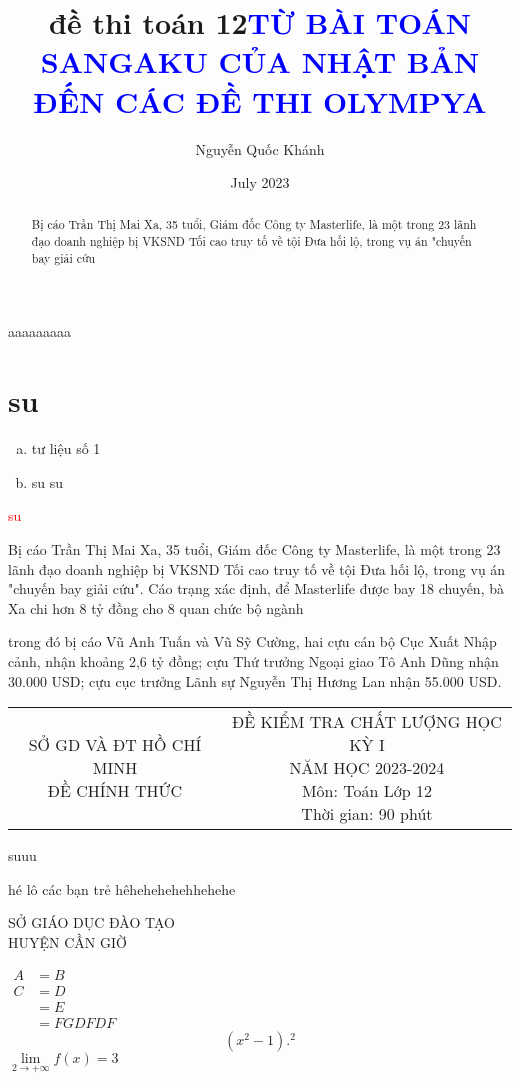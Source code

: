 \documentclass{article}
\title{đề thi toán 12}
\author{Nguyễn Quốc Khánh }
\date{July 2023}
\begin{document}
\fontsize{13pt}{16pt}\selectfont
 \tableofcontents 
\begin{abstract}
    Bị cáo Trần Thị Mai Xa, 35 tuổi, Giám đốc Công ty Masterlife, là một trong 23 lãnh đạo doanh nghiệp bị VKSND Tối cao truy tố về tội Đưa hối lộ, trong vụ án "chuyến bay giải cứu
\end{abstract}
\begin{flushright}
    aaaaaaaaa
\end{flushright}
\section{su}
\begin{enumerate}[a).]
    \item tư liệu số 1
    \item su su
\end{enumerate}
\textcolor{red}{su}
\title{\bfseries \textcolor{blue}{TỪ BÀI TOÁN SANGAKU CỦA NHẬT BẢN ĐẾN CÁC ĐỀ THI OLYMPYA}}
 Bị cáo Trần Thị Mai Xa, 35 tuổi, Giám đốc Công ty Masterlife, là một trong 23 lãnh đạo doanh nghiệp bị VKSND Tối cao truy tố về tội Đưa hối lộ, trong vụ án "chuyến bay giải cứu". Cáo trạng xác định, để Masterlife được bay 18 chuyến, bà Xa chi hơn 8 tỷ đồng cho 8 quan chức bộ ngành \par trong đó bị cáo Vũ Anh Tuấn và Vũ Sỹ Cường, hai cựu cán bộ Cục Xuất Nhập cảnh, nhận khoảng 2,6 tỷ đồng; cựu Thứ trưởng Ngoại giao Tô Anh Dũng nhận 30.000 USD; cựu cục trưởng Lãnh sự Nguyễn Thị Hương Lan nhận 55.000 USD.  
 
 \vspace*{10cm}
\noindent\begin{tabular}{cc}
\parbox{.4\textwidth}{\centering
SỞ GD VÀ ĐT HỒ CHÍ MINH \\
ĐỀ CHÍNH THỨC \\

\vspace*{32pt}
} &\parbox{.6\textwidth}{\centering
ĐỀ KIỂM TRA CHẤT LƯỢNG HỌC KỲ I \\
 NĂM HỌC 2023-2024 \\
Môn: Toán Lớp 12 \\
Thời gian: 90 phút 
} \\

\end{tabular}
\newpage
suuu
\begin{flushright}
    hé  lô  các  bạn trẻ hêhehehehehhehehe
\end{flushright}
\begin{minipage}{.3\textwidth}
 SỞ GIÁO DỤC ĐÀO TẠO \\ HUYỆN CẦN GIỜ
\end{minipage}
$\begin{aligned}
      A &  =B \\
      C & =D \\
           & =E \\
     & =FGDFDF
\end{aligned}$
\begin{equation}
    \left ( x^2-1 \right). ^2
\end{equation}
$\lim\limits_{2\to +\infty}f(x)=3$ \\
\end{document}
